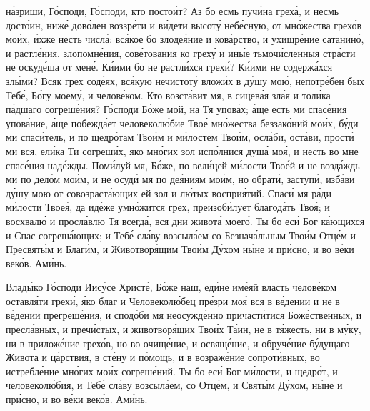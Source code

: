 \begin{mymulticols}
н\'{а}зриши, Г\'{о}споди, Г\'{о}споди, кто посто\'{и}т? Аз бо есмь пуч\'{и}на грех\'{а}, и несмь дост\'{о}ин, ниж\'{е} дов\'{о}лен воззр\'{е}ти и в\'{и}дети высот\'{у} неб\'{е}сную, от мн\'{о}жества грех\'{о}в мо\'{и}х, \'{и}хже несть числ\'{а}: вс\'{я}кое бо злоде\'{я}ние и ков\'{а}рство, и ухищр\'{е}ние сатанин\'{о}, и растл\'{е}ния, злопомн\'{е}ния, сов\'{е}тования ко грех\'{у} и ин\'{ы}е тьмоч\'{и}сленныя стр\'{а}сти не оскуд\'{е}ша от мен\'{е}. К\'{и}ими бо не растл\'{и}хся грех\'{и}? К\'{и}ими не содерж\'{а}хся зл\'{ы}ми? Всяк грех сод\'{е}ях, вс\'{я}кую нечистот\'{у} влож\'{и}х в д\'{у}шу мо\'{ю}, непотр\'{е}бен бых Теб\'{е}, Б\'{о}гу моем\'{у}, и челов\'{е}ком. Кто возст\'{а}вит мя, в сицев\'{а}я зл\'{а}я и тол\'{и}ка п\'{а}дшаго согреш\'{е}ния? Г\'{о}споди Б\'{о}же мой, на Тя упов\'{а}х; \'{а}ще есть ми спас\'{е}ния упов\'{а}ние, \'{а}ще побежд\'{а}ет человекол\'{ю}бие Тво\'{е} мн\'{о}жества беззак\'{о}ний мо\'{и}х, б\'{у}ди ми спас\'{и}тель, и по щедр\'{о}там Тво\'{и}м и м\'{и}лостем Тво\'{и}м, осл\'{а}би, ост\'{а}ви, прост\'{и} ми вся, ел\'{и}ка Ти согреш\'{и}х, яко мн\'{о}гих зол исп\'{о}лнися душ\'{а} мо\'{я}, и несть во мне спас\'{е}ния над\'{е}жды. Пом\'{и}луй мя, Б\'{о}же, по вел\'{и}цей м\'{и}лости Тво\'{е}й и не возд\'{а}ждь ми по дел\'{о}м мо\'{и}м, и не осуд\'{и} мя по де\'{я}ниям мо\'{и}м, но обрат\'{и}, заступ\'{и}, изб\'{а}ви д\'{у}шу мою от совозраст\'{а}ющих ей зол и л\'{ю}тых воспри\'{я}тий. Спас\'{и} мя р\'{а}ди м\'{и}лости Твое\'{я}, да ид\'{е}же умн\'{о}жится грех, преизоб\'{и}лует благод\'{а}ть Тво\'{я}; и восхвал\'{ю} и просл\'{а}влю Тя всегд\'{а}, вся дни живот\'{а} моег\'{о}. Ты бо ес\'{и} Бог к\'{а}ющихся и Спас согреш\'{а}ющих; и Теб\'{е} сл\'{а}ву возсыл\'{а}ем со Безнач\'{а}льным Тво\'{и}м Отц\'{е}м и Пресвят\'{ы}м и Благ\'{и}м, и Животвор\'{я}щим Тво\'{и}м Д\'{у}хом н\'{ы}не и пр\'{и}сно, и во в\'{е}ки век\'{о}в. Ам\'{и}нь.


Влад\'{ы}ко Г\'{о}споди Иис\'{у}се Христ\'{е}, Б\'{о}же наш, ед\'{и}не им\'{е}яй власть челов\'{е}ком оставл\'{я}ти грех\'{и}, \'{я}ко благ и Человекол\'{ю}бец пр\'{е}зри мо\'{я} вся в в\'{е}дении и не в в\'{е}дении прегреш\'{е}ния, и спод\'{о}би мя неосужд\'{е}нно причаст\'{и}тися Бож\'{е}ственных, и пресл\'{а}вных, и преч\'{и}стых, и животвор\'{я}щих Тво\'{и}х Т\'{а}ин, не в т\'{я}жесть, ни в м\'{у}ку, ни в прилож\'{е}ние грех\'{о}в, но во очищ\'{е}ние, и освящ\'{е}ние, и обруч\'{е}ние б\'{у}дущаго Живота и ц\'{а}рствия, в ст\'{е}ну и п\'{о}мощь, и в возраж\'{е}ние сопрот\'{и}вных, во истребл\'{е}ние мн\'{о}гих мо\'{и}х согреш\'{е}ний. Ты бо ес\'{и} Бог м\'{и}лости, и щедр\'{о}т, и человекол\'{ю}бия, и Теб\'{е} сл\'{а}ву возсыл\'{а}ем, со Отц\'{е}м, и Свят\'{ы}м Д\'{у}хом, н\'{ы}не и пр\'{и}сно, и во в\'{е}ки век\'{о}в. Ам\'{и}нь.


\end{mymulticols}
